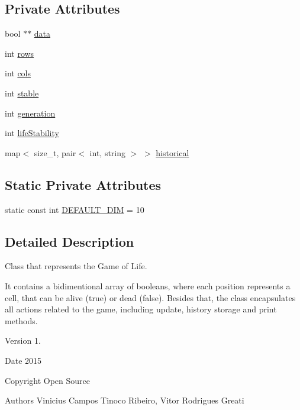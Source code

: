 \subsection*{Private Attributes}
\begin{DoxyCompactItemize}
\item 
bool $\ast$$\ast$ \hyperlink{classGameOfLife_a6e0a1d177ae3dd8c687ed766e57b3d36}{data}
\item 
int \hyperlink{classGameOfLife_a37d5c145e0ffc0b957988e8d5a0c910b}{rows}
\item 
int \hyperlink{classGameOfLife_a30e7fad7bbc05ad51404b84719b82bd2}{cols}
\item 
int \hyperlink{classGameOfLife_a59c0b43f3d368465d9473622fa8059f3}{stable}
\item 
int \hyperlink{classGameOfLife_aab1dc4078fe46596650d64ad50313555}{generation}
\item 
int \hyperlink{classGameOfLife_a0a05708cd58b7eadfd96d84a3641b835}{life\+Stability}
\item 
map$<$ size\+\_\+t, pair$<$ int, string $>$ $>$ \hyperlink{classGameOfLife_a11909babb91108b22e157efd3b2f75b8}{historical}
\end{DoxyCompactItemize}
\subsection*{Static Private Attributes}
\begin{DoxyCompactItemize}
\item 
static const int \hyperlink{classGameOfLife_a15976a2df224994b6fa2ca57242fd093}{D\+E\+F\+A\+U\+L\+T\+\_\+\+D\+IM} = 10
\end{DoxyCompactItemize}


\subsection{Detailed Description}
Class that represents the Game of Life. 

It contains a bidimentional array of booleans, where each position represents a cell, that can be alive (true) or dead (false). Besides that, the class encapsulates all actions related to the game, including update, history storage and print methods. \begin{DoxyVersion}{Version}
1. 
\end{DoxyVersion}
\begin{DoxyDate}{Date}
2015 
\end{DoxyDate}
\begin{DoxyCopyright}{Copyright}
Open Source 
\end{DoxyCopyright}
\begin{DoxyAuthor}{Authors}
Vinicius Campos Tinoco Ribeiro, Vitor Rodrigues Greati 
\end{DoxyAuthor}


